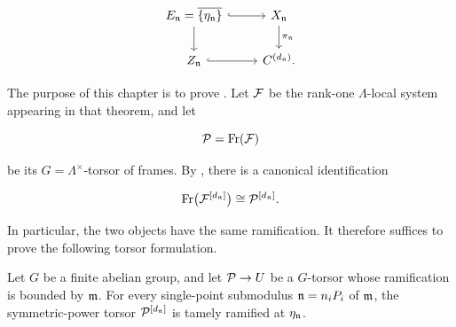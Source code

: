 \begin{equation}\label{equation:blowup_diagram_ndls}
\begin{tikzcd}
E_\ndls = \overline{\{\eta_\ndls\}}
    \arrow[r, hook] \arrow[d]
  & X_\ndls \arrow[d, "\pi_\ndls"] \\
Z_\ndls \arrow[r, hook]
  & C^{(d_\ndls)}.
\end{tikzcd}
\end{equation}

The purpose of this chapter is to prove
. Let $\mathcal{F}$ be
the rank-one $\Lambda$-local system appearing in that theorem, and let

\[
    \mathcal{P} = \operatorname{Fr}(\mathcal{F})
\]

be its $G = \Lambda^\times$-torsor of frames. By
,
there is a canonical identification

\[
    \operatorname{Fr}\bigl(\mathcal{F}^{[d_{\mathfrak{n}}]}\bigr)
        \cong \mathcal{P}^{[d_{\mathfrak{n}}]}.
\]

In particular, the two objects have the same ramification. It therefore
suffices to prove the following torsor formulation.

\begin{theorem}\label{theorem:torsors_after_blowup_is_tame}
Let $G$ be a finite abelian group, and let $\mathcal{P} \to U$ be a $G$-torsor whose
ramification is bounded by $\mathfrak{m}$. For every single-point submodulus
$\mathfrak{n} = n_iP_i$ of $\mathfrak{m}$, the symmetric-power torsor
$\mathcal{P}^{[d_{\mathfrak{n}}]}$ is tamely ramified at $\eta_{\mathfrak{n}}$.
\end{theorem}

